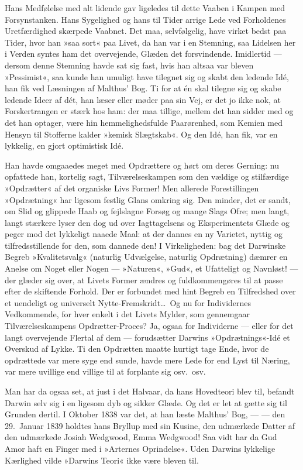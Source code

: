 \documentclass[12pt,a4paper]{article}
\begin{document}
Hans Medfølelse med alt lidende gav ligeledes til dette Vaaben
i Kampen med Forsynstanken. Hans Sygelighed og hans til Tider
arrige Lede ved Forholdenes Uretfærdighed skærpede Vaabnet.
Det maa, selvfølgelig, have virket bedst paa Tider, hvor han
»saa sort« paa Livet, da han var i en Stemning, saa Lidelsen
her i Verden syntes ham det overvejende, Glæden det
forsvindende. Imidlertid — dersom denne Stemning havde sat sig
fast, hvis han altsaa var bleven »Pessimist«, saa kunde han
umuligt have tilegnet sig og skabt den ledende Idé, han fik ved
Læsningen af Malthus' Bog. Ti for at én skal tilegne sig og
skabe ledende Ideer af dét, han læser eller møder paa sin Vej,
er det jo ikke nok, at Forskertrangen er stærk hos ham: der maa
tillige, mellem det han sidder med og det han optager, være hin
hemmelighedsfulde Paarørenhed, som Kemien med Hensyn til
Stofferne kalder »kemisk Slægtskab«. Og den Idé, han fik, var
en lykkelig, en gjort optimistisk Idé.

Han havde omgaaedes meget med Opdrættere og hørt om deres
Gerning: nu opfattede han, kortelig sagt, Tilværelseskampen som
den vældige og stilfærdige »Opdrætter« af det organiske Livs
Former! Men allerede Forestillingen »Opdrætning« har ligesom
festlig Glans omkring sig. Den minder, det er sandt, om Slid og
glippede Haab og fejlslagne Forsøg og mange Slags Ofre; men
langt, langt stærkere lyser den dog ud over Iagttagelsens og
Eksperimentets Glæde og peger mod det lykkeligt naaede Maal:
at der dannes en ny Varietet, nyttig og tilfredsstillende for
den, som dannede den! I Virkeligheden: bag det Darwinske
Begreb »Kvalitetsvalg« (naturlig Udvælgelse, naturlig
Opdrætning) dæmrer en Anelse om Noget eller Nogen —
»Naturen«, »Gud«, et Ufatteligt og Navnløst! — der glæder
sig over, at Livets Former ændres og fuldkommengøres til at
passe efter de skiftende Forhold. Der er forbundet med hint
Begreb en Tilfredshed over et uendeligt og universelt
Nytte-Fremskridt\ldots\ Og nu for Individernes Vedkommende,
for hver enkelt i det Livets Mylder, som gennemgaar
Tilværelseskampens Opdrætter-Proces? Ja, ogsaa for
Individerne — eller for det langt overvejende Flertal af dem —
forudsætter Darwins »Opdræt\-nings«-Idé et Overskud af Lykke.
Ti den Opdrætten maatte hurtigt tage Ende, hvor de opdrættede
var mere syge end sunde, havde mere Lede for end Lyst til
Næring, var mere uvillige end villige til at forplante sig
osv.\ osv.

Man har da ogsaa set, at just i det Halvaar, da hans
Hovedteori blev til, befandt Darwin selv sig i en ligesom dyb
og sikker Glæde. Og det er let at gætte sig til Grunden
dertil. I Oktober 1838 var det, at han læste Malthus' Bog,
— — den 29.\ Januar 1839 holdtes hans Bryllup med sin Kusine,
den udmærkede Datter af den udmærkede Josiah Wedgwood, Emma
Wedgwood! Saa vidt har da Gud Amor haft en Finger med i
»Arternes Oprindelse«. Uden Darwins lykkelige Kærlighed vilde
»Darwins Teori« ikke være bleven til.
\end{document}
